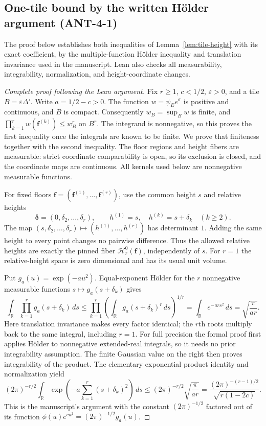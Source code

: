 
\subsection{One-tile bound by the written H\"older argument (ANT-4-1)}
\label{leanproof:ANT-4-1}

The proof below establishes both inequalities of Lemma~\ref{lem:tile-height}
with its exact coefficient, by the multiple-function H\"older inequality and
translation invariance used in the manuscript. Lean also checks all
measurability, integrability, normalization, and height-coordinate changes.

\begin{proof}[Complete proof following the Lean argument]
Fix \(r\ge1\), \(c<1/2\), \(\varepsilon>0\), and a tile
\(B=\varepsilon\Delta'\). Write \(a=1/2-c>0\). The function
\(w=\psi_E e^\sigma\) is positive and continuous, and \(B\) is compact.
Consequently \(w_B=\sup_Bw\) is finite, and
\(\prod_{k=1}^r w(\mathbf f^{(k)})\le w_B^r\) on \(B^r\).
The integrand is nonnegative, so this proves the first inequality once
the integrals are known to be finite. We prove that finiteness together
with the second inequality.
The floor regions and height fibers are measurable: strict coordinate
comparability is open, so its exclusion is closed, and the coordinate
maps are continuous. All kernels used below are nonnegative measurable
functions.

For fixed floors \(\mathbf f=(\mathbf f^{(1)},\ldots,\mathbf f^{(r)})\),
use the common height \(s\) and relative heights
\[
 \boldsymbol\delta=(0,\delta_2,\ldots,\delta_r),\qquad
 h^{(1)}=s,\quad h^{(k)}=s+\delta_k\quad (k\ge2).
\]
The map \((s,\delta_2,\ldots,\delta_r)\mapsto(h^{(1)},\ldots,h^{(r)})\)
has determinant \(1\). Adding the same height to every point changes
no pairwise difference. Thus the allowed relative heights are exactly
the pinned fiber \(\mathcal H_r^0(\mathbf f)\), independently of \(s\).
For \(r=1\) the relative-height space is zero dimensional and has
its usual unit volume.

Put \(g_a(u)=\exp(-au^2)\). Equal-exponent H\"older for the \(r\)
nonnegative measurable functions \(s\mapsto g_a(s+\delta_k)\) gives
\[
 \int_{\mathbb R}\prod_{k=1}^r g_a(s+\delta_k)\,ds
 \le \prod_{k=1}^r\left(\int_{\mathbb R}g_a(s+\delta_k)^r\,ds\right)^{1/r}
 =\int_{\mathbb R}e^{-ar s^2}\,ds
 =\sqrt{\frac\pi{ar}}.
\]
Here translation invariance makes every factor identical; the \(r\)th roots
multiply back to the same integral, including \(r=1\).
For full precision the formal proof first applies H\"older to nonnegative
extended-real integrals, so it needs no prior integrability assumption.
The finite Gaussian value on the right then proves integrability of the
product. The elementary exponential product identity and normalization yield
\[
 (2\pi)^{-r/2}\int_{\mathbb R}
     \exp\!\left(-a\sum_{k=1}^r(s+\delta_k)^2\right)\,ds
 \le (2\pi)^{-r/2}\sqrt{\frac\pi{ar}}
 =\frac{(2\pi)^{-(r-1)/2}}{\sqrt{r(1-2c)}}.
\]
This is the manuscript's argument with the constant
\((2\pi)^{-1/2}\) factored out of its function
\(\phi(u)e^{cu^2}=(2\pi)^{-1/2}g_a(u)\).


\end{proof}
